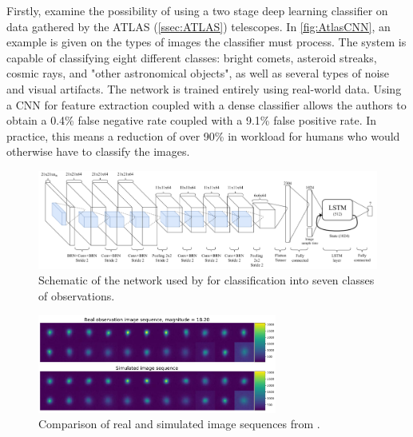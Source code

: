 Firstly, \cite{AtlasDL} examine the possibility of using a two stage deep learning classifier on data gathered by the ATLAS (\autoref{ssec:ATLAS}) telescopes. In \autoref{fig:AtlasCNN}, an example is given on the types of images the classifier must process. The system is capable of classifying eight different classes: bright comets, asteroid streaks, cosmic rays, and "other astronomical objects", as well as several types of noise and visual artifacts. The network is trained entirely using real-world data. Using a CNN for feature extraction coupled with a dense classifier allows the authors to obtain a 0.4\% false negative rate coupled with a 9.1\% false positive rate. In practice, this means a reduction of over 90\% in workload for humans who would otherwise have to classify the images. \\

\begin{figure}[htbp]
    \centering
    \includegraphics[width=1.0\textwidth]{images/ztfclassifier.png}
    \caption{Schematic of the network used by \cite{processingDLtwo} for classification into seven classes of observations.}
    \label{fig:ztfnetwork}
\end{figure}

\begin{figure}[htbp]
    \centering
    \includegraphics[width=0.7\textwidth]{images/ztfsimulation.png}
    \caption{Comparison of real and simulated image sequences from \cite{processingDLtwo}.}
    \label{fig:ztfsim}
\end{figure}

